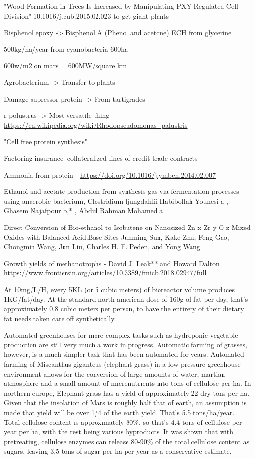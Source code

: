 \documentclass[10pt]{article}
\begin{document}
"Wood Formation in Trees Is Increased by Manipulating PXY-Regulated Cell Division" 10.1016/j.cub.2015.02.023 to get giant plants

Bisphenol epoxy ->
Bisphenol A (Phenol and acetone)
ECH from glycerine

500kg/ha/year from cyanobacteria
600ha

600w/m2 on mars = 600MW/square km

Agrobacterium -> Transfer to plants

Damage supressor protein -> From tartigrades

r polustrus -> Most versatile thing \url{https://en.wikipedia.org/wiki/Rhodopseudomonas_palustris}

"Cell free protein synthesis"


Factoring insurance, collateralized lines of credit trade contracts

Ammonia from protein - \url{https://doi.org/10.1016/j.ymben.2014.02.007}


Ethanol and acetate production from synthesis gas via fermentation
processes using anaerobic bacterium, Clostridium ljungdahlii
Habibollah Younesi a , Ghasem Najafpour b,* , Abdul Rahman Mohamed a

Direct Conversion of Bio-ethanol to Isobutene on Nanosized Zn x Zr y O z
Mixed Oxides with Balanced Acid.Base Sites
Junming Sun,  Kake Zhu, Feng Gao,  Chongmin Wang,  Jun Liu,  Charles H. F. Peden,  and Yong Wang 



Growth yields of methanotrophs - David J. Leak** and  Howard Dalton 
\url{https://www.frontiersin.org/articles/10.3389/fmicb.2018.02947/full}

At 10mg/L/H, every 5KL (or 5 cubic meters) of bioreactor volume produces 1KG/fat/day. At the standard north american dose of 160g of fat per day, that's approximately 0.8 cubic meters per person, to have the entirety of their dietary fat needs taken care off synthetically.

Automated greenhouses for more complex tasks such as hydroponic vegetable production are still very much a work in progress. Automatic farming of grasses, however, is a much simpler task that has been automated for years. Automated farming of Miscanthus giganteus (elephant grass) in a low pressure greenhouse environment allows for the conversion of large amounts of water, martian atmosphere and a small amount of micronutrients into tons of cellulose per ha. In northern europe, Elephant grass has a yield of approximately 22 dry tons per ha. Given that the insolation of Mars is roughly half that of earth, an assumption is made that yield will be over 1/4 of the earth yield. That's 5.5 tons/ha/year. Total cellulose content is approximately 80\%, so that's 4.4 tons of cellulose per year per ha, with the rest being various byproducts. It was shown that with pretreating, cellulose enzymes can release 80-90\% of the total cellulose content as sugars, leaving 3.5 tons of sugar per ha per year as a conservative estimate.
\end{document}
